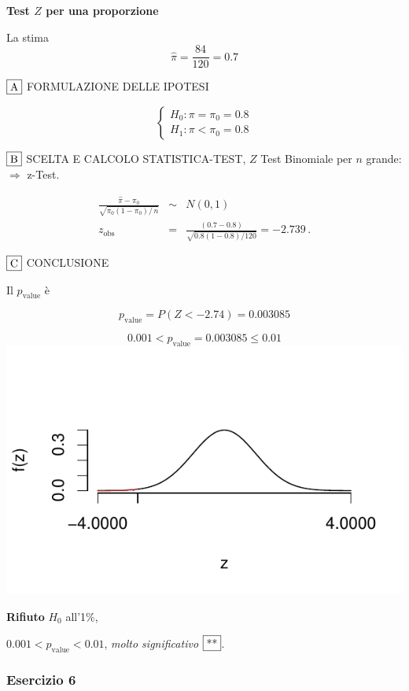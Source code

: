 \documentclass[
  10pt,
]{article}
\begin{document}
\begin{sol}
\textbf{Test \(Z\) per una proporzione}

La stima
\[\hat\pi=\frac { 84 } { 120 }= 0.7  \]

\(\fbox{A}\) FORMULAZIONE DELLE IPOTESI

\[\begin{cases}
   H_0: \pi = \pi_0=0.8 \\
   H_1: \pi < \pi_0=0.8 
   \end{cases}\]

\(\fbox{B}\) SCELTA E CALCOLO STATISTICA-TEST, \(Z\)
Test Binomiale per \(n\) grande: \(\Rightarrow\) z-Test.

\begin{eqnarray*}
   \frac{\hat\pi - \pi_{0}} {\sqrt {\pi_0(1-\pi_0)/\,n}}&\sim&N(0,1)\\
   z_{\text{obs}}
   &=& \frac{ ( 0.7 -  0.8 )} {\sqrt{ 0.8 (1- 0.8 )/ 120 }}
   =   -2.739 \,.
   \end{eqnarray*}

\(\fbox{C}\) CONCLUSIONE

Il \(p_{\text{value}}\) è

\[ p_{\text{value}} = P(Z<-2.74)=0.003085 \]

\[
 0.001 < p_\text{value}= 0.003085 \leq 0.01 
\]\includegraphics{www/compito_files/figure-latex/2024-130-1.pdf}

\textbf{Rifiuto} \(H_0\) all'1\%,

\(0.001<p_\text{value}<0.01\), \emph{molto significativo} \(\fbox{**}\).

\end{sol}

\subsubsection{Esercizio 6}\label{esercizio-6}
\end{document}
